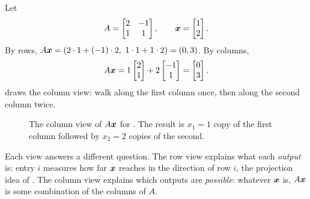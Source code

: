 \begin{example}
  \label{ex:ch03-matvec}
  Let
  \[
    A =
    \begin{bmatrix} 2 & -1 \\ 1 & 1 \end{bmatrix},
    \qquad
    \bm{x} = \begin{bmatrix} 1 \\ 2 \end{bmatrix}.
  \]
  By rows, $A\bm{x} = (2 \cdot 1 + (-1) \cdot 2,\ 1 \cdot 1 + 1 \cdot 2)
  = (0, 3)$. By columns,
  \[
    A\bm{x} = 1 \begin{bmatrix} 2 \\ 1 \end{bmatrix}
      + 2 \begin{bmatrix} -1 \\ 1 \end{bmatrix}
    = \begin{bmatrix} 0 \\ 3 \end{bmatrix}.
  \]
   draws the column view: walk along the first
  column once, then along the second column twice.
\end{example}

\begin{figure}[ht]
  \centering
  \caption{The column view of $A\bm{x}$ for . The
    result is $x_1 = 1$ copy of the first column followed by $x_2 = 2$
    copies of the second.}
  \label{fig:ch03-col-view}
\end{figure}

Each view answers a different question. The row view explains what each
\emph{output} is: entry $i$ measures how far $\bm{x}$ reaches in the
direction of row $i$, the projection idea of .
The column view explains which outputs are \emph{possible}: whatever
$\bm{x}$ is, $A\bm{x}$ is some combination of the columns of $A$.

